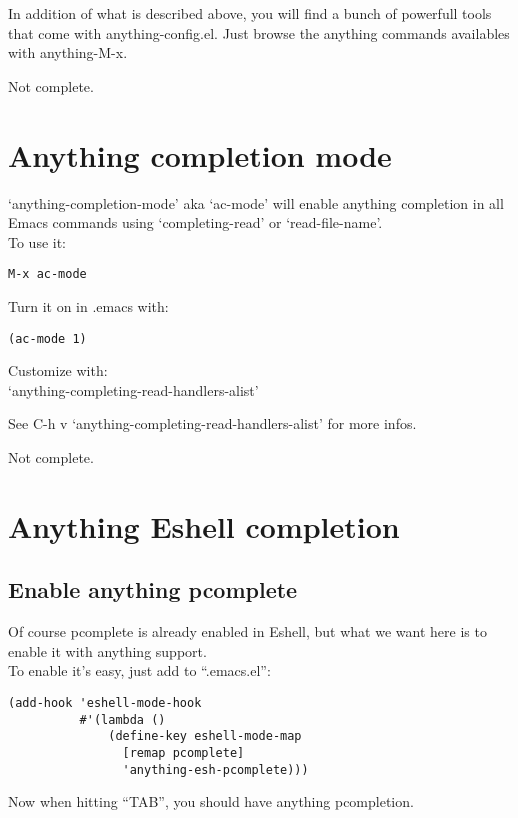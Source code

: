 \documentclass[a4paper,11pt]{article}
\newenvironment{encadre}{%
  \begin{lrbox}{\boiteencadre}%
  \begin{minipage}{.8\textwidth}}{%
  \end{minipage}
  \end{lrbox}%
  \begin{center}
    \fbox{\usebox{\boiteencadre}}
  \end{center}}
\begin{document}
In addition of what is described above, you will find a bunch of powerfull tools that come with anything-config.el.
Just browse the anything commands availables with anything-M-x.

Not complete.

\section{Anything completion mode}
\label{sec:anyth-compl-mode}
`anything-completion-mode' aka `ac-mode' will enable anything completion in all 
Emacs commands using `completing-read' or `read-file-name'.\\
To use it:
\begin{verbatim}
M-x ac-mode
\end{verbatim}
Turn it on in .emacs with:
\begin{verbatim}
(ac-mode 1)
\end{verbatim}
Customize with:\\
`anything-completing-read-handlers-alist'

See C-h v `anything-completing-read-handlers-alist' for more infos.

Not complete.

\section{Anything Eshell completion}
\label{sec:anyth-eshell-compl}

\subsection{Enable anything pcomplete}
\label{sec:enable-anyth-pcompl}


Of course pcomplete is already enabled in Eshell, but what we want here 
is to enable it with anything support. \\
To enable it's easy, just add to ``.emacs.el'':

\begin{encadre}
\begin{verbatim}
(add-hook 'eshell-mode-hook
          #'(lambda ()
              (define-key eshell-mode-map 
                [remap pcomplete]
                'anything-esh-pcomplete)))

\end{verbatim}
\end{encadre}

Now when hitting ``TAB'', you should have anything pcompletion.\\
\\
\end{document}
